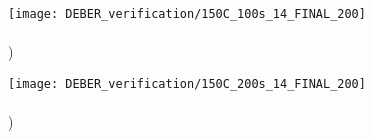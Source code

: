 \begin{figure}[h!]
	\begin{minipage}{0.48\textwidth}
		\texttt{[image: DEBER\_verification/150C\_100s\_14\_FINAL\_200]} \\
		\vspace{-13em} \\ ) \\ \vspace{13em}
	\end{minipage}
	\begin{minipage}{0.48\textwidth}
		\texttt{[image: DEBER\_verification/150C\_200s\_14\_FINAL\_200]} \\
		\vspace{-13em} \\ ) \\ \vspace{13em}
	\end{minipage}

	\vspace{-3em}


\end{figure}
